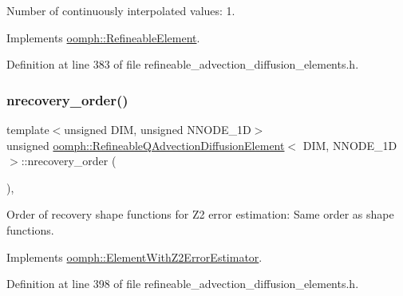 Number of continuously interpolated values\+: 1. 



Implements \hyperlink{classoomph_1_1RefineableElement_a53e171a18c9f43f1db90a6876516a073}{oomph\+::\+Refineable\+Element}.



Definition at line 383 of file refineable\+\_\+advection\+\_\+diffusion\+\_\+elements.\+h.

\mbox{\label{classoomph_1_1RefineableQAdvectionDiffusionElement_abd5f23d9c5da2bcd579ee279422891f4}} 
\subsubsection{\texorpdfstring{nrecovery\+\_\+order()}{nrecovery\_order()}}
{\footnotesize\ttfamily template$<$unsigned D\+IM, unsigned N\+N\+O\+D\+E\+\_\+1D$>$ \\
unsigned \hyperlink{classoomph_1_1RefineableQAdvectionDiffusionElement}{oomph\+::\+Refineable\+Q\+Advection\+Diffusion\+Element}$<$ D\+IM, N\+N\+O\+D\+E\+\_\+1D $>$\+::nrecovery\+\_\+order (\begin{DoxyParamCaption}{ }\end{DoxyParamCaption})\hspace{0.3cm}{\ttfamily [inline]}, {\ttfamily [virtual]}}



Order of recovery shape functions for Z2 error estimation\+: Same order as shape functions. 



Implements \hyperlink{classoomph_1_1ElementWithZ2ErrorEstimator_af39480835bd3e0f6b2f4f7a9a4044798}{oomph\+::\+Element\+With\+Z2\+Error\+Estimator}.



Definition at line 398 of file refineable\+\_\+advection\+\_\+diffusion\+\_\+elements.\+h.

\mbox{\label{classoomph_1_1RefineableQAdvectionDiffusionElement_a158f8e02a8fc6b9a1c650b3e0f832041}} 
